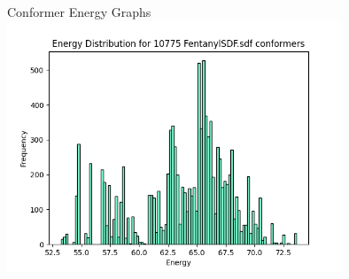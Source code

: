 \documentclass{beamer}
\begin{document}
\begin{frame}{Conformer Energy Graphs}
\includegraphics[width=10cm]{img/Graphs/FentanylSDF_Energy_Histogram.png}
\end{frame}
\end{document}
